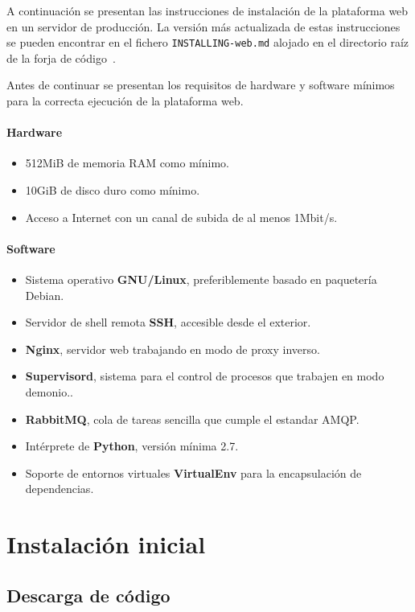 A continuación se presentan las instrucciones de instalación de la plataforma
web en un servidor de producción. La versión más actualizada de estas
instrucciones se pueden encontrar en el fichero \texttt{INSTALLING-web.md}
alojado en el directorio raíz de la forja de código~\cite{forja}.

Antes de continuar se presentan los requisitos de hardware y software mínimos
para la correcta ejecución de la plataforma web.

\paragraph{Hardware}

\begin{itemize}
\item 512MiB de memoria RAM como mínimo.
\item 10GiB de disco duro como mínimo.
\item Acceso a Internet con un canal de subida de al menos 1Mbit/s.
\end{itemize}

\paragraph{Software}

\begin{itemize}
\item Sistema operativo \textbf{GNU/Linux}, preferiblemente basado en paquetería Debian.
\item Servidor de shell remota \textbf{SSH}, accesible desde el exterior.
\item \textbf{Nginx}, servidor web trabajando en modo de proxy inverso.
\item \textbf{Supervisord}, sistema para el control de procesos que trabajen en modo demonio..
\item \textbf{RabbitMQ}, cola de tareas sencilla que cumple el estandar \ac{AMQP}.
\item Intérprete de \textbf{Python}, versión mínima 2.7.
\item Soporte de entornos virtuales \textbf{VirtualEnv} para la encapsulación de
  dependencias.
\end{itemize}


\section{Instalación inicial}

\subsection{Descarga de código}

